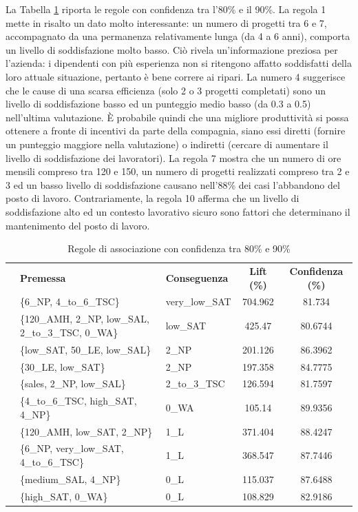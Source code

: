 \documentclass[a4paper]{article}
\newcounter{rowno}
\begin{document}
La Tabella \ref{tab:rules_conf_80_90} riporta le regole con confidenza tra l'80\% e il 90\%. La regola 1 mette in risalto un dato molto interessante: un numero di progetti tra 6 e 7, accompagnato da una permanenza relativamente lunga (da 4 a 6 anni), comporta un livello di soddisfazione molto basso. Ciò rivela un'informazione preziosa per l'azienda: i dipendenti con più esperienza non si ritengono affatto soddisfatti della loro attuale situazione, pertanto è bene correre ai ripari. La numero  4 suggerisce che le cause di una scarsa efficienza (solo 2 o 3 progetti completati) sono un livello di soddisfazione basso ed un punteggio medio basso (da 0.3 a 0.5) nell'ultima valutazione. È probabile quindi che una migliore produttività si possa ottenere a fronte di incentivi da parte della compagnia, siano essi diretti (fornire un punteggio maggiore nella valutazione) o indiretti (cercare di aumentare il livello di soddisfazione dei lavoratori). La regola 7 mostra che un numero di ore mensili compreso tra 120 e 150, un numero di progetti realizzati compreso tra 2 e 3 ed un basso livello di soddisfazione causano nell'88\% dei casi l'abbandono del posto di lavoro. Contrariamente, la regola 10 afferma che un livello di soddisfazione alto ed un contesto lavorativo sicuro sono fattori che determinano il mantenimento del posto di lavoro. 

\begin{table}[h]
\centering
\begingroup
\setlength{\tabcolsep}{4pt} %
\renewcommand{\arraystretch}{1} %
\setcounter{rowno}{0}

\begin{tabularx}{\textwidth}{|>{\stepcounter{rowno}\therowno}c|X|l|c|c|}
\hline
\multicolumn{1}{r}{\#} & {\textbf{Premessa}} & {\textbf{Conseguenza}} & {\textbf{Lift (\%)}} & {\textbf{Confidenza (\%)}} \\

& \{6\_NP, 4\_to\_6\_TSC\} & very\_low\_SAT & 704.962 & 81.734 \\ 
& \{120\_AMH, 2\_NP, low\_SAL, 2\_to\_3\_TSC, 0\_WA\} & low\_SAT & 425.47 & 80.6744 \\ 
& \{low\_SAT, 50\_LE, low\_SAL\} & 2\_NP & 201.126 & 86.3962 \\ 
& \{30\_LE, low\_SAT\} & 2\_NP & 197.358 & 84.7775 \\ 
& \{sales, 2\_NP, low\_SAL\} & 2\_to\_3\_TSC & 126.594 & 81.7597 \\ 
& \{4\_to\_6\_TSC, high\_SAT, 4\_NP\} & 0\_WA & 105.14 & 89.9356 \\ 
& \{120\_AMH, low\_SAT, 2\_NP\} & 1\_L & 371.404 & 88.4247 \\ 
& \{6\_NP, very\_low\_SAT, 4\_to\_6\_TSC\} & 1\_L & 368.547 & 87.7446 \\ 
& \{medium\_SAL, 4\_NP\} & 0\_L & 115.037 & 87.6488 \\ 
& \{high\_SAT, 0\_WA\} & 0\_L & 108.829 & 82.9186 \\ 
\hline
\end{tabularx}
\endgroup
\caption{Regole di associazione con confidenza tra 80\% e 90\%}
\label{tab:rules_conf_80_90}
\end{table}
\end{document}
